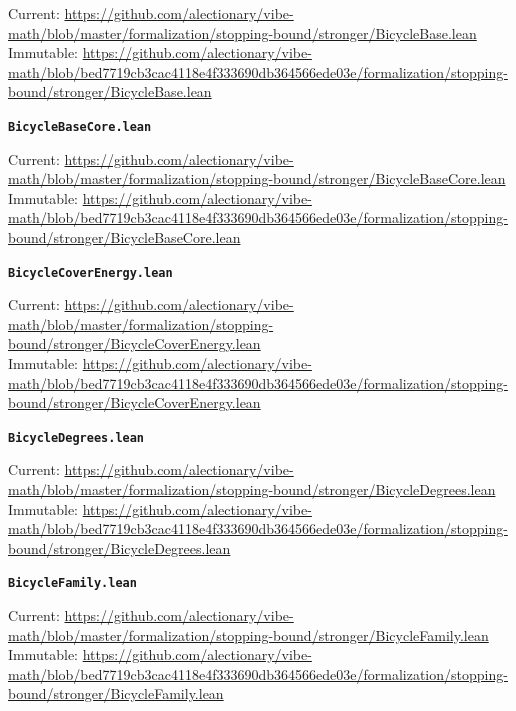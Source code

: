 {\footnotesize\noindent Current: \url{https://github.com/alectionary/vibe-math/blob/master/formalization/stopping-bound/stronger/BicycleBase.lean}\\
Immutable: \url{https://github.com/alectionary/vibe-math/blob/bed7719cb3cac4118e4f333690db364566ede03e/formalization/stopping-bound/stronger/BicycleBase.lean}\par}
\smallskip
\medskip
\par\noindent\textbf{\texttt{BicycleBaseCore.lean}}\par\nopagebreak
{\footnotesize\noindent Current: \url{https://github.com/alectionary/vibe-math/blob/master/formalization/stopping-bound/stronger/BicycleBaseCore.lean}\\
Immutable: \url{https://github.com/alectionary/vibe-math/blob/bed7719cb3cac4118e4f333690db364566ede03e/formalization/stopping-bound/stronger/BicycleBaseCore.lean}\par}
\smallskip
\medskip
\par\noindent\textbf{\texttt{BicycleCoverEnergy.lean}}\par\nopagebreak
{\footnotesize\noindent Current: \url{https://github.com/alectionary/vibe-math/blob/master/formalization/stopping-bound/stronger/BicycleCoverEnergy.lean}\\
Immutable: \url{https://github.com/alectionary/vibe-math/blob/bed7719cb3cac4118e4f333690db364566ede03e/formalization/stopping-bound/stronger/BicycleCoverEnergy.lean}\par}
\smallskip
\medskip
\par\noindent\textbf{\texttt{BicycleDegrees.lean}}\par\nopagebreak
{\footnotesize\noindent Current: \url{https://github.com/alectionary/vibe-math/blob/master/formalization/stopping-bound/stronger/BicycleDegrees.lean}\\
Immutable: \url{https://github.com/alectionary/vibe-math/blob/bed7719cb3cac4118e4f333690db364566ede03e/formalization/stopping-bound/stronger/BicycleDegrees.lean}\par}
\smallskip
\medskip
\par\noindent\textbf{\texttt{BicycleFamily.lean}}\par\nopagebreak
{\footnotesize\noindent Current: \url{https://github.com/alectionary/vibe-math/blob/master/formalization/stopping-bound/stronger/BicycleFamily.lean}\\
Immutable: \url{https://github.com/alectionary/vibe-math/blob/bed7719cb3cac4118e4f333690db364566ede03e/formalization/stopping-bound/stronger/BicycleFamily.lean}\par}
